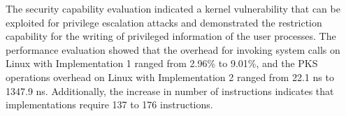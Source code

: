 %
%

%
%
%
The security capability evaluation indicated a kernel vulnerability that can be
exploited for privilege escalation attacks and demonstrated the restriction
capability for the writing of privileged information of the user processes.
%
The performance evaluation showed that the overhead for invoking system calls 
on Linux with Implementation 1 ranged from 2.96\% to 9.01\%, and the PKS
operations overhead on Linux with Implementation 2 ranged from 22.1 ns to 1347.9
ns.
%
Additionally, the increase in number of instructions indicates that
implementations require 137 to 176 instructions.

